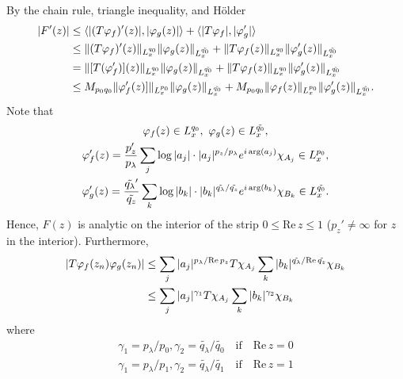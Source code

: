 %
%
By the chain rule, triangle inequality, and H{\"o}lder
%
%
\begin{equation*}
\begin{split}
| F'(z) |
& \le \langle | (T{\varphi_f})'(z) |, | \varphi_{g}(z) | \rangle + \langle | T
\varphi_{f} |, |\varphi'_{g}| \rangle
\\
& \le \| (T\varphi_{f})'(z) \|_{L_x^{q_0}} \|\varphi_{g}(z)\|_{L_x^{\tilde{q_0}}} + \|
T\varphi_{f}(z) \|_{L_x^{q_0}} \|\varphi_{g}'(z) \|_{L_x^{\tilde{q_0}}}
\\
& = \| [T( \varphi'_{f})](z) \|_{L_x^{q_0}} \|\varphi_{g}(z)\|_{L_x^{\tilde{q_0}}} + \|
T\varphi_{f}(z) \|_{L_x^{q_0}} \|\varphi_{g}'(z) \|_{L_x^{\tilde{q_0}}}
\\
& \le M_{p_0 q_0}
\| \varphi'_{f}(z)] \|_{L_x^{p_0}} \|\varphi_{g}(z)\|_{L_x^{\tilde{q_0}}} + M_{p_0 q_0}\|
\varphi_{f}(z) \|_{L_x^{p_0}} \|\varphi_{g}'(z) \|_{L_x^{\tilde{q_0}}}.
\end{split}
\end{equation*}
%
%
Note that
%
%
\begin{gather*}
	\varphi_{f}(z) \in L^{q_0}_x, \ \varphi_{g}(z) \in L_{x}^{\tilde{q_0}},
\\
\varphi_{f}'(z) = \frac{p_z'}{p_\lambda} \sum_{j} \log |a_j| \cdot |
a_j|^{p_z/p_\lambda}e^{i \arg(a_j)} \chi_{A_j} \in L^{p_0}_x,
\\
\varphi'_{g}(z) =  \frac{\tilde{q_\lambda}'}{\tilde{q_z}} \sum_{k} \log|b_k| \cdot
| b_k |^{\tilde{q_\lambda} / \tilde{q_z}} e^{i
\arg(b_k)} \chi_{B_k} \in L_{x}^{\tilde{q_0}}.
\end{gather*}
%
%
Hence, $F(z)$ is analytic on the interior of the strip $0 \le \text{Re}\, z \le
1$ ($p_z' \neq \infty$ for $z$ in the interior). Furthermore,
%
%
\begin{equation*}
\begin{split}
| T \varphi_{f}(z_n) \varphi_{g}(z_n) | 
& \le \sum_{j} | a_j |^{p_\lambda / \text{Re}\, p_z} T \chi_{A_j}
\sum_{k} | b_k |^{\tilde{q_\lambda} / \text{Re}\, \tilde{q_z}} \chi_{B_k}
\\
& \le \sum_{j} | a_j |^{\gamma_1} T \chi_{A_j}
\sum_{k} | b_k |^{\gamma_2} \chi_{B_k}\end{split}
\end{equation*}
%
%
where
%
%
\begin{gather*}
\gamma_1 = p_\lambda/p_0, \gamma_2 = \tilde{q_\lambda}/\tilde{q_0} \quad
\text{if} \quad \text{Re}\, z=0
\\
\gamma_1 = p_\lambda/p_1, \gamma_2 = \tilde{q_\lambda}/\tilde{q_1}\quad
\text{if} \quad \text{Re}\, z=1
\end{gather*}
